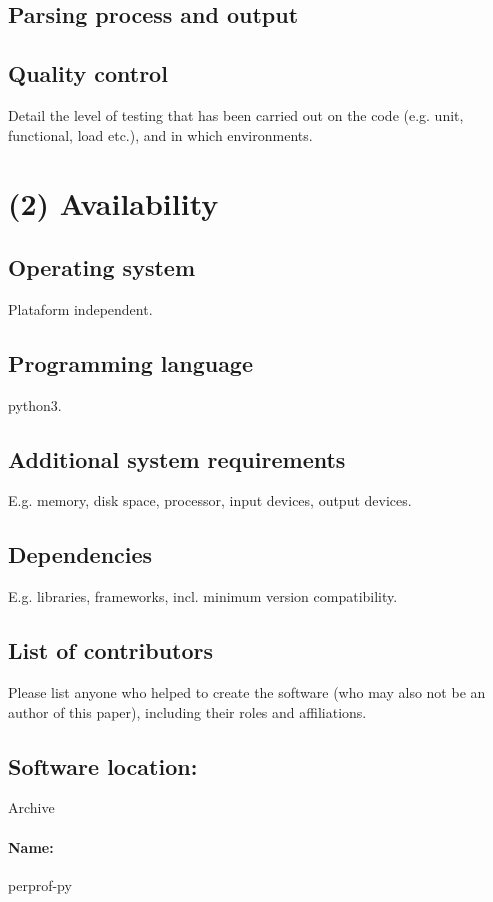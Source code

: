 \documentclass[10pt,a4paper]{article}
\begin{document}
\subsection*{Parsing process and output}

\subsection*{Quality control}
Detail the level of testing that has been carried out on the code (e.g. unit, functional, load etc.), and in which environments. 

\section*{(2) Availability}

\subsection*{Operating system}
Plataform independent.

\subsection*{Programming language}
python3.

\subsection*{Additional system requirements}
E.g. memory, disk space, processor, input devices, output devices.

\subsection*{Dependencies}
E.g. libraries, frameworks, incl. minimum version compatibility.

\subsection*{List of contributors}
Please list anyone who helped to create the software (who may also not be an author of this paper), including their roles and affiliations.

\subsection*{Software location:}
Archive  

\paragraph{Name:} perprof-py
\end{document}
